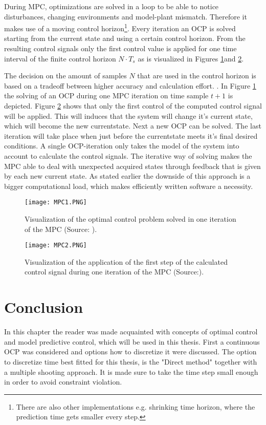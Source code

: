 During MPC, optimizations are solved in a loop to be able to notice disturbances, changing environments and model-plant mismatch. Therefore it makes use of a moving control horizon\footnote{There are also other implementations e.g. shrinking time horizon, where the prediction time gets smaller every step.}. Every iteration an OCP is solved starting from the current state and using a certain control horizon.  From the resulting control signals only the first control value is applied for one time interval of the finite control horizon $N\cdot T_{s}$ as is visualized in Figures \ref{fig:MPC1}and \ref{fig:MPC2}.

The decision on the amount of samples $N$ that are used in the control horizon is based on a tradeoff between higher accuracy and calculation effort. \cite{TongDuySon2019, Mercy2018}. In Figure \ref{fig:MPC1} the solving of an OCP during one MPC iteration on time sample $t+1$ is depicted. Figure \ref{fig:MPC2} shows that only the first control of the computed control signal will be applied.  This will induces that the system will change it's current state, which will become the new currentstate. Next a new OCP can be solved. The last iteration will take place when just before the currentstate meets it's final desired conditions. A single OCP-iteration only takes the model of the system into account to calculate the control signals. The iterative way of solving makes the MPC able to deal with unexpected acquired states through feedback that is given by each new current state. As stated earlier the downside of this approach is a bigger computational load, which makes efficiently written software a necessity.  \cite{Patrinos2019}\\

\begin{figure}[h!]
	\centering
	\texttt{[image: MPC1.PNG]}
	\caption{Visualization of the optimal control problem solved in one iteration of the MPC (Source: \cite{Patrinos2019}).}
	\label{fig:MPC1}
\end{figure}

\begin{figure}[h!]
	\centering
	\texttt{[image: MPC2.PNG]}
	\caption{Visualization of the application of the first step of the calculated control signal during one iteration of the MPC (Source:\cite{Patrinos2019}).}
	\label{fig:MPC2}
\end{figure}


\section{Conclusion}
In this chapter the reader was made acquainted with concepts of optimal control and model predictive control, which will be used in this thesis. 
First a continuous OCP was considered and options how to discretize it were discussed. The option to discretize time best fitted for this thesis, is the "Direct method" together with a multiple shooting approach. It is made sure to take the time step small enough in order to avoid constraint violation. 



